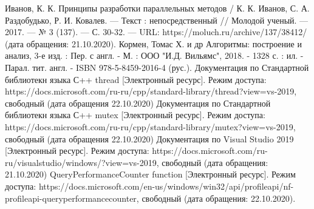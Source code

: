 \documentclass[12pt]{report}
\begin{document}
	\renewcommand\bibname{Список литературы}
	
	
	
	\newpage
	
	
	
	
	
	\newpage
	
	
	
%	
	
	\begin{thebibliography}{2}
		Иванов, К. К. Принципы разработки параллельных методов / К. К. Иванов, С. А. Раздобудько, Р. И. Ковалев. — Текст : непосредственный // Молодой ученый. — 2017. — № 3 (137). — С. 30-32. — URL: https://moluch.ru/archive/137/38412/ (дата обращения: 21.10.2020).
		 Кормен, Томас Х. и др Алгоритмы: построение и анализ, 3-е изд. : Пер. с англ. - М. : ООО "И.Д. Вильямс", 2018. - 1328 с. : ил. - Парал. тит. англ. -  ISBN 978-5-8459-2016-4 (рус.).
		 Документация по Стандартной библиотекн языка С++ thread [Электронный ресурс]. Режим доступа: https://docs.microsoft.com/ru-ru/cpp/standard-library/thread?view=vs-2019, свободный (дата обращения 22.10.2020)
		 Документация по Стандартной библиотекн языка С++ mutex [Электронный ресурс]. Режим доступа: https://docs.microsoft.com/ru-ru/cpp/standard-library/mutex?view=vs-2019, свободный (дата обращения 22.10.2020)
		 Документация по Visual Studio 2019 [Электронный ресурс]. Режим доступа: https://docs.microsoft.com/ru-ru/visualstudio/windows/?view=vs-2019, свободный (дата обращения: 21.10.2020)
		 QueryPerformanceCounter function [Электронный ресурс]. Режим доступа: https://docs.microsoft.com/en-us/windows/win32/api/profileapi/nf-profileapi-queryperformancecounter, свободный (дата обращения: 22.10.2020).
	\end{thebibliography}
\end{document}
